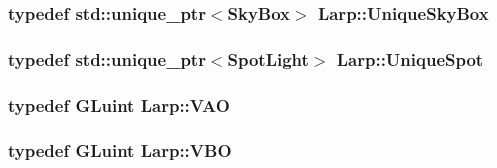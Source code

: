 \subsubsection[{\texorpdfstring{Unique\+Sky\+Box}{UniqueSkyBox}}]{\setlength{\rightskip}{0pt plus 5cm}typedef std\+::unique\+\_\+ptr$<${\bf Sky\+Box}$>$ {\bf Larp\+::\+Unique\+Sky\+Box}}\hypertarget{namespaceLarp_a9acaa85c01aee19dafa995b4eba59bd0}{}\label{namespaceLarp_a9acaa85c01aee19dafa995b4eba59bd0}
\subsubsection[{\texorpdfstring{Unique\+Spot}{UniqueSpot}}]{\setlength{\rightskip}{0pt plus 5cm}typedef std\+::unique\+\_\+ptr$<${\bf Spot\+Light}$>$ {\bf Larp\+::\+Unique\+Spot}}\hypertarget{namespaceLarp_a288b58c470c3ed41d3b23e764ba5b6eb}{}\label{namespaceLarp_a288b58c470c3ed41d3b23e764ba5b6eb}
\subsubsection[{\texorpdfstring{V\+AO}{VAO}}]{\setlength{\rightskip}{0pt plus 5cm}typedef G\+Luint {\bf Larp\+::\+V\+AO}}\hypertarget{namespaceLarp_a459edfbf6a0def594cfeb6ecaa5d702e}{}\label{namespaceLarp_a459edfbf6a0def594cfeb6ecaa5d702e}
\subsubsection[{\texorpdfstring{V\+BO}{VBO}}]{\setlength{\rightskip}{0pt plus 5cm}typedef G\+Luint {\bf Larp\+::\+V\+BO}}\hypertarget{namespaceLarp_ac6c5fe9357b92190f95c04109eb8c4f1}{}\label{namespaceLarp_ac6c5fe9357b92190f95c04109eb8c4f1}
